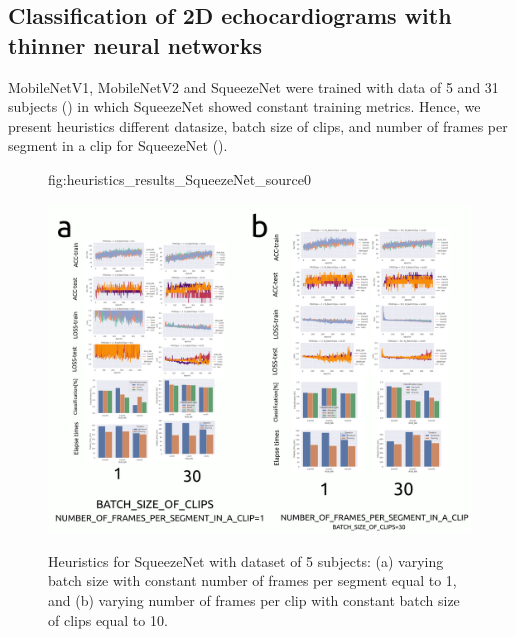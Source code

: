 \documentclass[mlabstract,twocolumn]{jmlr}
\begin{document}
\subsection{Classification of 2D echocardiograms with thinner neural networks} \label{subsec:echocardiogramsthinnerNets}
MobileNetV1, MobileNetV2 and SqueezeNet were trained with data of 5 and 31 subjects () in which SqueezeNet showed constant training metrics.
Hence, we present heuristics different datasize, batch size of clips, and number of frames per segment in a clip for SqueezeNet ().
\begin{figure}[ht]%
\floatconts
  {fig:heuristics_results_SqueezeNet_source0}
  {
      \caption{
          Heuristics for SqueezeNet with dataset of 5 subjects: %
          (a) varying batch size with constant number of frames per segment equal to 1, and
          (b) varying number of frames per clip with constant batch size of clips equal to 10.
      }
  }
  {\includegraphics[width=0.95\linewidth]{../figures/heuristics_results_SqueezeNet_source0_with_05-31-subjects/versions/drawing-v03}}%
\end{figure}
\end{document}
